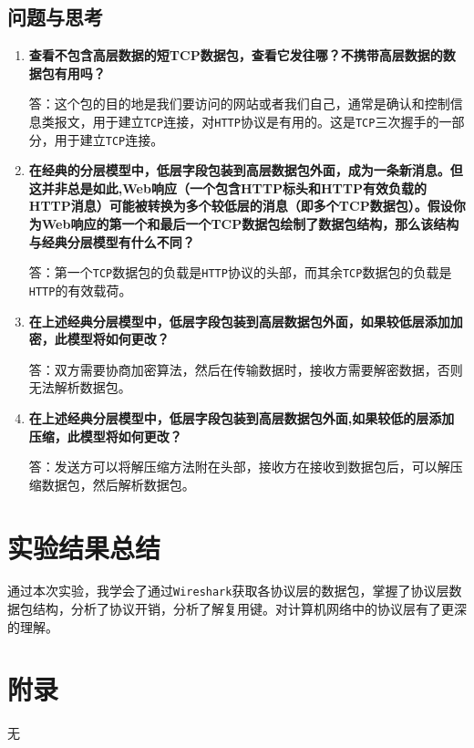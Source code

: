 \documentclass{article}
\begin{document}
\subsection{问题与思考}

\begin{enumerate}[noitemsep]
  \item \textbf{查看不包含高层数据的短TCP数据包，查看它发往哪？不携带高层数据的数据包有用吗？}

  答：这个包的目的地是我们要访问的网站或者我们自己，通常是确认和控制信息类报文，用于建立\texttt{TCP}连接，对\texttt{HTTP}协议是有用的。这是\texttt{TCP}三次握手的一部分，用于建立\texttt{TCP}连接。

  \item \textbf{在经典的分层模型中，低层字段包装到高层数据包外面，成为一条新消息。但这并非总是如此,Web响应（一个包含HTTP标头和HTTP有效负载的HTTP消息）可能被转换为多个较低层的消息（即多个TCP数据包）。假设你为Web响应的第一个和最后一个TCP数据包绘制了数据包结构，那么该结构与经典分层模型有什么不同？}

  答：第一个\texttt{TCP}数据包的负载是\texttt{HTTP}协议的头部，而其余\texttt{TCP}数据包的负载是\texttt{HTTP}的有效载荷。


  \item \textbf{在上述经典分层模型中，低层字段包装到高层数据包外面，如果较低层添加加密，此模型将如何更改？}

  答：双方需要协商加密算法，然后在传输数据时，接收方需要解密数据，否则无法解析数据包。

  \item \textbf{在上述经典分层模型中，低层字段包装到高层数据包外面,如果较低的层添加压缩，此模型将如何更改？}

  答：发送方可以将解压缩方法附在头部，接收方在接收到数据包后，可以解压缩数据包，然后解析数据包。

\end{enumerate}

\section{实验结果总结}

通过本次实验，我学会了通过\texttt{Wireshark}获取各协议层的数据包，掌握了协议层数据包结构，分析了协议开销，分析了解复用键。对计算机网络中的协议层有了更深的理解。

\section{附录}

无
\end{document}
